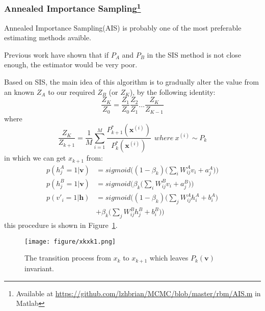 
\subsubsection{Annealed Importance Sampling\protect\footnote{Available at \protect\url{https://github.com/lzhbrian/MCMC/blob/master/rbm/AIS.m} in Matlab}}

Annealed Importance Sampling(AIS)\cite{neal2001annealed,salakhutdinov2009learning} is probably one of the most preferable estimating methods avaible.

Previous work \cite{mackay2003information} have shown that if $P_{A}$ and $P_{B}$ in the SIS method is not close enough, the estimator would be very poor.

Based on SIS, the main idea of this algorithm is to gradually alter the value from an known $Z_{A}$ to our required $Z_{B}$ (or $Z_{K}$), by the following identity:
\begin{equation}
\frac{Z_{K}}{Z_{0}} = \frac{Z_{1}}{Z_{0}} \frac{Z_{2}}{Z_{1}} ... \frac{Z_{K}}{Z_{K-1}}
\end{equation}
where 
\begin{equation}
\frac{Z_{K}}{Z_{k+1}} = \frac{1}{M} \sum_{i=1}^{M} \frac{P_{k+1}^{*}(\mathbf x^{(i)})}{P_{k}^{*}(\mathbf x^{(i)})}
~~where~ x^{(i)} \sim P_{k}
\end{equation}
in which we can get $x_{k+1}$ from:
\begin{equation}
\begin{aligned}
p(h^{A}_{j}=1|\mathbf v) &= sigmoid\Bigg( (1-\beta_{k})\Bigg(\sum_{i}W^{A}_{ij}v_{i}+a^{A}_{j}\Bigg) \Bigg) \\
p(h^{B}_{j}=1|\mathbf v) &= sigmoid\Bigg( \beta_{k}\Bigg(\sum_{i}W^{B}_{ij}v_{i}+a^{B}_{j}\Bigg) \Bigg) \\ 
p(v'_{i}=1|\mathbf h) &= sigmoid\Bigg( (1-\beta_{k})\Bigg(\sum_{j}W^{A}_{ij}h_{i}^{A}+b^{A}_{i}\Bigg) \\
& + \beta_{k}\Bigg(\sum_{j}W^{B}_{ij}h_{j}^{B}+b^{B}_{i}\Bigg) \Bigg) 
\end{aligned}
\end{equation}
this procedure is shown in Figure~\ref{fig:xkxk1}.

\begin{figure}[tb]
  	\centering
  	\texttt{[image: figure/xkxk1.png]}
	\caption{The transition process from $x_{k}$ to $x_{k+1}$ which leaves $P_{k}(\mathbf v)$ invariant.}
	\label{fig:xkxk1}
\end{figure}

